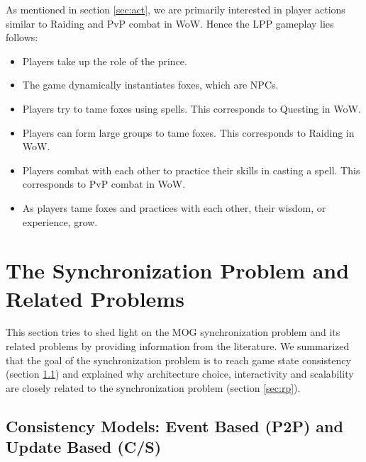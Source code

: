 \documentclass{article}
\begin{document}
As mentioned in section \ref{sec:act}, we are primarily interested in player actions similar to Raiding and PvP combat in WoW. Hence the LPP gameplay lies follows:
\begin{itemize}
\item Players take up the role of the prince.
\item The game dynamically instantiates foxes, which are NPCs.
\item Players try to tame foxes using spells. This corresponds to Questing in WoW.
\item Players can form large groups to tame foxes. This corresponds to Raiding in WoW.
\item Players combat with each other to practice their skills in casting a spell. This corresponds to PvP combat in WoW.
\item As players tame foxes and practices with each other, their wisdom, or experience, grow.
\end{itemize}


\section{The Synchronization Problem and Related Problems}
\label{dfsync}
This section tries to shed light on the MOG synchronization problem and its related problems by providing information from the literature. We summarized that the goal of the synchronization problem is to reach game state consistency (section \ref{sec:cm}) and explained why architecture choice, interactivity and scalability are closely related to the synchronization problem (section \ref{sec:rp}).

\subsection{Consistency Models: Event Based (P2P) and Update Based (C/S)}
\label{sec:cm}
\end{document}
